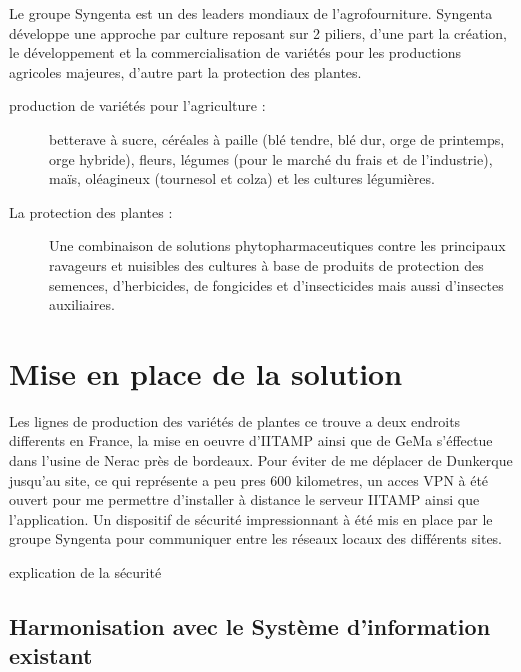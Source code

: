 Le groupe Syngenta est un des leaders mondiaux de l’agrofourniture.
Syngenta développe une approche par culture reposant sur 2 piliers,
d'une part la création, le développement et la commercialisation de
variétés pour les productions agricoles majeures, d'autre part la
protection des plantes.

\begin{description}

  \item[production de variétés pour l'agriculture :] betterave à sucre,
    céréales à paille (blé tendre, blé dur, orge de printemps, orge
    hybride), fleurs, légumes (pour le marché du frais et de
    l’industrie), maïs, oléagineux (tournesol et colza) et les cultures
    légumières.

  \item[La protection des plantes :] Une combinaison de solutions
    phytopharmaceutiques contre les principaux ravageurs et nuisibles
    des cultures à base de produits de protection des semences,
    d’herbicides, de fongicides et d’insecticides mais aussi d’insectes
    auxiliaires.

\end{description}

\section{Mise en place de la solution} %
\label{sec:Mise en place de la solution}

Les lignes de production des variétés de plantes ce trouve a deux
endroits differents en France, la mise en oeuvre d'IITAMP ainsi que de
GeMa s'éffectue dans l'usine de Nerac près de bordeaux. Pour éviter de
me déplacer de Dunkerque jusqu'au site, ce qui représente a peu pres 600
kilometres, un acces VPN à été ouvert pour me permettre d'installer à
distance le serveur IITAMP ainsi que l'application. Un dispositif de
sécurité impressionnant à été mis en place par le groupe Syngenta pour
communiquer entre les réseaux locaux des différents sites.

explication de la sécurité

\subsection{Harmonisation avec le Système d'information existant} %
\label{sub:Harmonisation avec le Système d'information existant}

